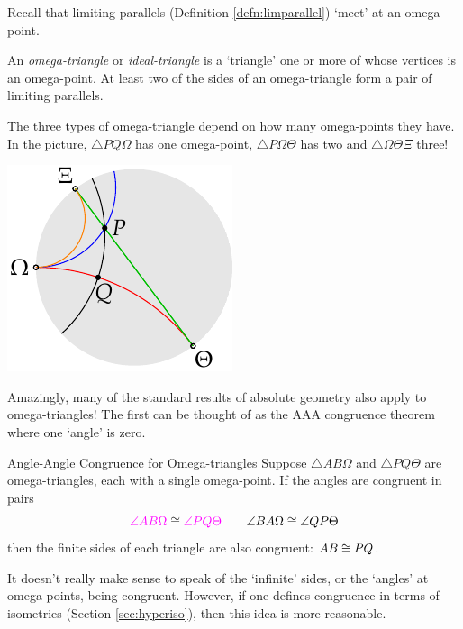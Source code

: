 \begin{minipage}[t]{0.7\linewidth}\vspace{-5pt}
	Recall that limiting parallels (Definition \ref{defn:limparallel}) `meet' at an omega-point.
	
	\begin{defn}{}{}
		An \emph{omega-triangle} or \emph{ideal-triangle} is a `triangle' one or more of whose vertices is an omega-point. At least two of the sides of an omega-triangle form a pair of limiting parallels.
	\end{defn}
	
	The three types of omega-triangle depend on how many omega-points they have. In the picture, $\triangle PQ\Omega$ has one omega-point, $\triangle P\Omega\Theta$ has two and $\triangle \Omega\Theta\Xi$ three!
\end{minipage}
\hfill
\begin{minipage}[t]{0.28\linewidth}\vspace{-5pt}
	\flushright\includegraphics{omega-example}
\end{minipage}\smallbreak
Amazingly, many of the standard results of absolute geometry also apply to omega-triangles! The first can be thought of as the AAA congruence theorem where one `angle' is zero.

\begin{thm}{Angle-Angle Congruence for Omega-triangles}{}
	Suppose $\triangle AB\Omega$ and $\triangle PQ\Theta$ are omega-triangles, each with a single omega-point. If the angles are congruent in pairs
	\[
		\textcolor{Magenta}{\angle AB\Omega} \cong \textcolor{Magenta}{\angle PQ\Theta} \qquad \angle BA\Omega \cong\angle QP\Theta
	\]
	then the finite sides of each triangle are also congruent: $\overline{AB}\cong\overline{PQ}$.
\end{thm}

It doesn't really make sense to speak of the `infinite' sides, or the `angles' at omega-points, being congruent. However, if one defines congruence in terms of isometries (Section \ref{sec:hyperiso}), then this idea is more reasonable.

